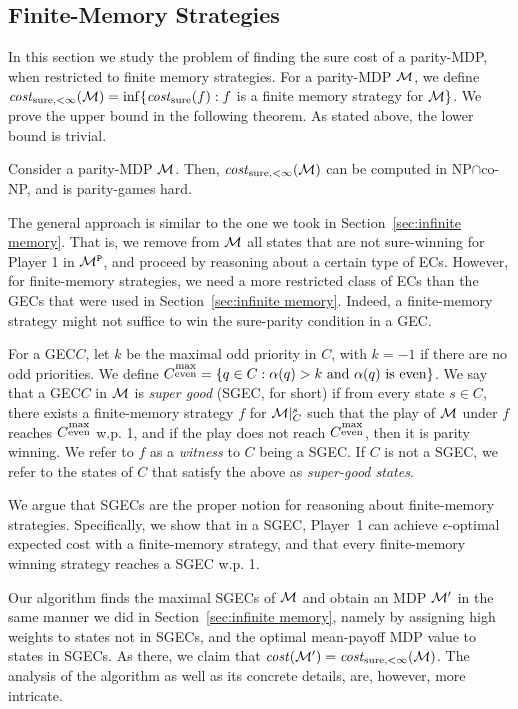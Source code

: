 \documentclass[runningheads,a4paper]{llncs}
\newcommand{\set}[1]{{\{#1\}}}
\newcommand{\M}{{\cal M}}
\renewcommand{\P}{{\mathtt P}}
\newcommand{\cost}{{\it cost}}
\newcommand{\costs}{{\it cost}_{\rm sure}}
\newcommand{\costsf}{{\it cost}_{\rm sure,<\infty}}
\newcommand{\gec}{{GEC}\xspace}
\newcommand{\sgec}{{SGEC}\xspace}
\newcommand{\gecs}{{GECs}\xspace}
\newcommand{\sgecs}{{SGECs}\xspace}
\newcommand{\me}{{\substack{\rm max\\ \rm even}}}
\begin{document}
\subsection{Finite-Memory Strategies}
\label{sec:finite memory}
In this section we study the problem of finding the sure cost of a parity-MDP, when restricted to finite memory strategies. For a parity-MDP $\M$, we define $\costsf(\M)=\inf\{\costs(f): f $ is a finite memory strategy for $\M\}$. We prove the upper bound in the following theorem. As stated above, the lower bound is trivial.


\begin{theorem}
\label{thm:parityMDP finite NP cap co-NP}
Consider a parity-MDP $\M$. Then, $\costsf(\M)$ can be computed in NP$\cap$co-NP, and is parity-games hard.
\end{theorem}

\vspace*{-5pt}
The general approach is similar to the one we took in Section~\ref{sec:infinite memory}. That is, we remove from $\M$ all states that are not sure-winning for Player 1 in $\M^\P$, and proceed by reasoning about a certain type of ECs. However, for finite-memory strategies, we need a more restricted class of ECs than the \gecs that were used in Section~\ref{sec:infinite memory}. Indeed, a finite-memory strategy might not suffice to win the sure-parity condition in a \gec.

For a \gec $C$, let $k$ be the maximal odd priority in $C$, with $k=-1$ if there are no odd priorities. We define $C^\me=\set{q\in C: \alpha(q)>k\text{ and }\alpha(q)\text{ is even}}$.
 We say that a \gec $C$ in $\M$ is {\em super good} (\sgec, for short) if from every state $s\in C$, there exists a finite-memory strategy $f$ for $\M|_C^s$ such that the play of $\M$ under $f$ reaches $C^{\me}$ w.p. 1, and 
if the play does not reach $C^{\me}$, then it is parity winning.
We refer to $f$ as a {\em witness} to $C$ being a \sgec. If $C$ is not a \sgec, we refer to the states of $C$ that satisfy the above as {\em super-good states}.

We argue that \sgecs are the proper notion for reasoning about finite-memory strategies. Specifically, we show that in a \sgec, Player~1 can achieve $\epsilon$-optimal expected cost with a finite-memory strategy, and that every finite-memory winning strategy reaches a \sgec w.p. 1.

Our algorithm finds the maximal \sgecs of $\M$ and obtain an MDP $\M'$ in the same manner we did in Section~\ref{sec:infinite memory}, namely by assigning high weights to states not in \sgecs, and the optimal mean-payoff MDP value to states in \sgecs. As there, we claim that $\cost(\M')=\costsf(\M)$. The analysis of the algorithm as well as its concrete details, are, however, more intricate. 
\end{document}
